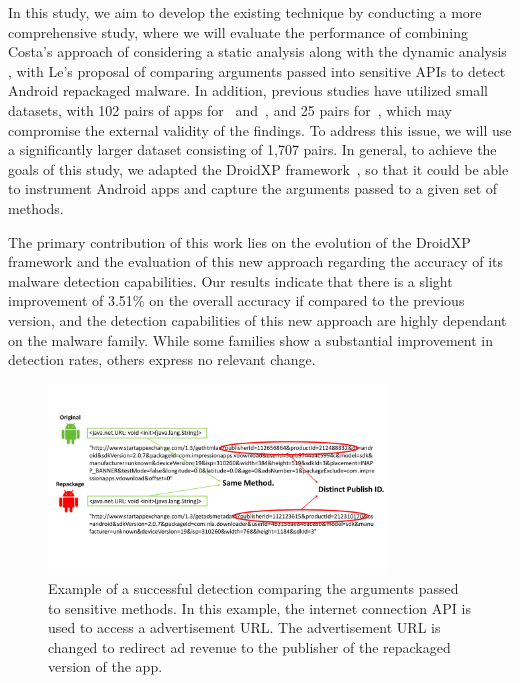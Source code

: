In this study, we aim to develop the existing technique by conducting a more comprehensive study, where we will evaluate the performance of combining Costa's approach of considering a static analysis along with the dynamic analysis \cite{costa_exploring_2022}, with Le's proposal of comparing arguments passed into sensitive APIs \cite{le_towards_2018} to detect Android repackaged malware. In addition, previous studies have utilized small datasets, with 102 pairs of apps for~\cite{bao_mining_2018} and~\cite{costa_exploring_2022}, and 25 pairs for~\cite{le_towards_2018}, which may compromise the external validity of the findings. To address this issue, we will use a significantly larger dataset consisting of 1,707 pairs. In general, to achieve the goals of this study, we adapted the  DroidXP framework~\cite{costa_droidxp_2020}, so that it could be able to instrument Android apps and capture the arguments passed to a given set of methods.

The primary contribution of this work lies on the evolution of the DroidXP framework and the evaluation of this new approach regarding the accuracy of its malware detection capabilities. Our results indicate that there is a slight improvement of 3.51\% on the overall accuracy if compared to the previous version, and the detection capabilities of this new approach are highly dependant on the malware family. While some families show a substantial improvement in detection rates, others express no relevant change.

\begin{figure}
    \centering
    \includegraphics[width=0.8\textwidth]{img/parameterDiff.pdf}
    \caption{Example of a successful detection comparing the arguments passed to sensitive methods. In this example, the internet connection API is used to access a advertisement URL. The advertisement URL is changed to redirect ad revenue to the publisher of the repackaged version of the app.}
    \label{fig:successful-detection-example}
\end{figure}


